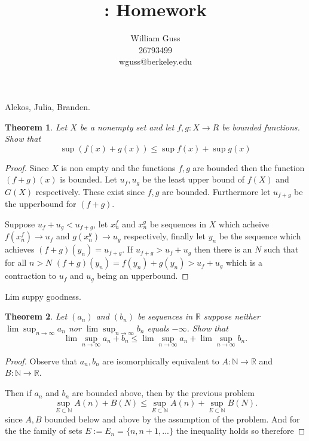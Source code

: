 \documentclass[letter]{article}
\title{\bCLASS: Homework \bHWN}
\author{William Guss\\26793499\\wguss@berkeley.edu}
\newtheorem{theorem}{Theorem}
\newenvironment{menumerate}{%
  \edef\backupindent{\the\parindent}%
  \enumerate%
  \setlength{\parindent}{\backupindent}%
}{\endenumerate}
\begin{document}
\maketitle
\thispagestyle{empty}
 Alekos, Julia, Branden. 
\begin{menumerate}
	\item 
	\begin{theorem}
		Let $X$ be a nonempty set and let $f, g : X \to R$ be bounded functions. Show that 
		$$ \sup(f(x) + g(x)) \leq \sup f(x) + \sup g(x)$$ 
	\end{theorem}
	\begin{proof}
		Since $X$ is non empty and the functions $f,g $ are bounded then the function $(f + g)(x)$  is bounded. Let $u_f, u_g$ be the least upper bound of $f(X)$ and $G(X)$ respectively. These exist since $f, g$ are bounded. Furthermore let $u_{f+g}$ be the upperbound for $(f+g).$ 

		Suppose $u_{f} + u_g < u_{f+g}$, let $x^f_n$ and $x^g_n$ be sequences in $X$ which acheive $f(x^f_n) \to u_f$ and $g(x^g_n) \to u_g$ respectively, finally let $y_n$ be the sequence which achieves $(f+g)(y_n) = u_{f+g}$. If $u_{f+g} > u_f + u_g$ then there is an $N$ such that for all $n > N$ 
		$(f+g)(y_n) = f(y_n) + g(y_n) > u_f + u_g$ which is a contraction to $u_f$ and $u_g$ being an upperbound.
	\end{proof}

	\item Lim suppy goodness.
	\begin{theorem}
		Let $(a_n)$ and $(b_n)$ be sequences in $\mathbb{R}$  suppose neither $\lim \sup_{n\to\infty} a_n$ nor $\lim \sup_{n\to\infty} b_n$ equals $-\infty$. Show that 
		$$ \lim \sup_{n\to\infty} a_n + b_n \leq \lim \sup_{n\to\infty} a_n + \lim \sup_{n\to\infty} b_n.$$
	\end{theorem}
	\begin{proof}
		Observe that $a_n, b_n$ are isomorphically equivalent to $A: \mathbb{N} \to \mathbb{R}$ and $B: \mathbb{N} \to \mathbb{R}$. 

		Then if $a_n$ and $b_n$ are bounded above, then by the previous problem 
		\begin{equation}
			\sup_{E \subset \mathbb{N}} A(n) + B(N) \leq \sup_{E \subset \mathbb{N}} A(n) + \sup_{E \subset \mathbb{N}} B(N).
		\end{equation}
		since $A, B$ bounded below and above by the assumption of the problem.
		And for the the family of sets $E := E_n =\{n, n+1, ...\}$
	 	the inequality holds so therefore


\end{proof}
\end{menumerate}
\end{document}

